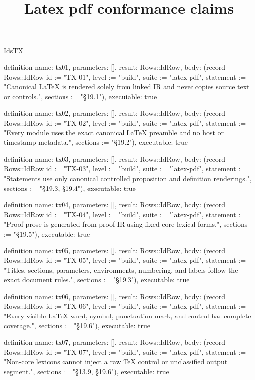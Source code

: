 \begin{lexlean}{IdsTX}
\title{Latex pdf conformance claims}
\begin{semanticmodule}
definition{
  name: tx01,
  parameters: [],
  result: Rows::IdRow,
  body: (record Rows::IdRow {id := "TX-01", level := "build", suite := "latex-pdf", statement := "Canonical LaTeX is rendered solely from linked IR and never copies source text or controls.", sections := "§19.1"}),
  executable: true
}

definition{
  name: tx02,
  parameters: [],
  result: Rows::IdRow,
  body: (record Rows::IdRow {id := "TX-02", level := "build", suite := "latex-pdf", statement := "Every module uses the exact canonical LaTeX preamble and no host or timestamp metadata.", sections := "§19.2"}),
  executable: true
}

definition{
  name: tx03,
  parameters: [],
  result: Rows::IdRow,
  body: (record Rows::IdRow {id := "TX-03", level := "build", suite := "latex-pdf", statement := "Statements use only canonical controlled proposition and definition renderings.", sections := "§19.3, §19.4"}),
  executable: true
}

definition{
  name: tx04,
  parameters: [],
  result: Rows::IdRow,
  body: (record Rows::IdRow {id := "TX-04", level := "build", suite := "latex-pdf", statement := "Proof prose is generated from proof IR using fixed core lexical forms.", sections := "§19.5"}),
  executable: true
}

definition{
  name: tx05,
  parameters: [],
  result: Rows::IdRow,
  body: (record Rows::IdRow {id := "TX-05", level := "build", suite := "latex-pdf", statement := "Titles, sections, parameters, environments, numbering, and labels follow the exact document rules.", sections := "§19.3"}),
  executable: true
}

definition{
  name: tx06,
  parameters: [],
  result: Rows::IdRow,
  body: (record Rows::IdRow {id := "TX-06", level := "build", suite := "latex-pdf", statement := "Every visible LaTeX word, symbol, punctuation mark, and control has complete coverage.", sections := "§19.6"}),
  executable: true
}

definition{
  name: tx07,
  parameters: [],
  result: Rows::IdRow,
  body: (record Rows::IdRow {id := "TX-07", level := "build", suite := "latex-pdf", statement := "Non-core lexicons cannot inject a raw TeX control or unclassified output segment.", sections := "§13.9, §19.6"}),
  executable: true
}


\end{semanticmodule}
\end{lexlean}
